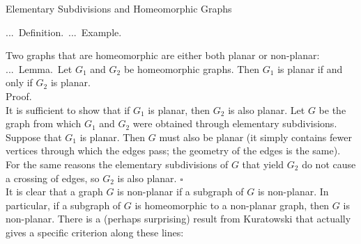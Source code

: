 \documentclass[smaller,hyperref={CJKbookmarks=true}]{beamer}
\newenvironment{PROOF}{{\noindent\!\sf\alert{Proof.}}\\}{\hfill$\square$\\}
\newcounter{zhuo}[subsection]
\renewcommand{\thezhuo}{\thesection.\thesubsection.\arabic{zhuo}}
\newenvironment{DEFINITION}{\stepcounter{zhuo}\alert{\thezhuo.~Definition.\,}}{}
\newenvironment{EXAMPLE}{\stepcounter{zhuo}\alert{\!\thezhuo.~Example.\,}}{}
\newenvironment{LEMMA}{\stepcounter{zhuo}\alert{\thezhuo.~Lemma.\,}}{}
\begin{document}
\begin{frame}{Elementary Subdivisions and Homeomorphic Graphs}
\begin{spacing}{0.9}
\begin{DEFINITION}
\begin{EXAMPLE}
\begin{center}
\end{center}
\end{EXAMPLE}
\end{DEFINITION}
\end{spacing}
\newpage
\begin{spacing}{1.1}
Two graphs that are homeomorphic are either both planar or non-planar:\\[5pt]
\begin{LEMMA}
Let $G_1$ and $G_2$ be homeomorphic graphs. Then $G_1$ is planar if and only if $G_2$ is planar.\\[6pt]
\end{LEMMA}
\begin{PROOF}
It is sufficient to show that if $G_1$ is planar, then $G_2$ is also planar. Let $G$
be the graph from which $G_1$ and $G_2$ were obtained through elementary
subdivisions. Suppose that $G_1$ is planar. Then $G$ must also be planar (it
simply contains fewer vertices through which the edges pass; the geometry
of the edges is the same). For the same reasons the elementary
subdivisions of $G$ that yield $G_2$ do not cause a crossing of edges, so $G_2$ is
also planar.
\end{PROOF}
\vspace*{5pt}
It is clear that a graph $G$ is non-planar if a subgraph of $G$ is non-planar. In
particular, if a subgraph of $G$ is homeomorphic to a non-planar graph,
then $G$ is non-planar. There is a (perhaps surprising) result from
Kuratowski that actually gives a specific criterion along these lines:
\end{spacing}
\end{frame}
\end{document}
